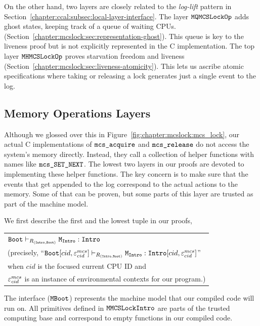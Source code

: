 On the other hand, two layers are closely related to the  \textit{log-lift} pattern in Section~\ref{chapter:ccal:subsec:local-layer-interface}.
The layer ${\mathrm{\texttt{MQMCSLockOp}}}$ adds ghost states, keeping track of a
queue of waiting CPUs.
(Section~\ref{chapter:mcslock:sec:representation-ghost}). This queue is key to the liveness proof but is not explicitly represented in the C implementation.
The top layer ${\mathrm{\texttt{MHMCSLockOp}}}$ proves starvation freedom and liveness
(Section~\ref{chapter:mcslock:sec:liveness-atomicity}). This lets us ascribe atomic
specifications where taking or releasing a lock generates just a
single event to the log.

\subsection{Memory Operations Layers}
\label{chapter:mcslock:subsec:lowestmachinemodel}


Although we glossed over this in Figure~\ref{fig:chapter:mcslock:mcs_lock}, our
actual C implementations of ${\mathrm{\texttt{mcs\_acquire}}}$ and
${\mathrm{\texttt{mcs\_release}}}$ do not access the system's memory directly.  Instead, they call
a collection of helper functions with names like
${\mathrm{\texttt{mcs\_SET\_NEXT}}}$. The lowest two layers in our proofs
are devoted to implementing these helper functions.
The key concern is to make sure that the events that get appended to the log correspond to the actual actions to the memory. Some of that can be proven, 
but some parts of this layer are trusted as part of the machine model.

We first describe the first and the lowest tuple in our proofs,

\begin{center}
\begin{tabular}{P{0.95\textwidth}}
${\mathrm{\texttt{Boot}}} \vdash_{R_{({\mathrm{\texttt{Intro}}}, {\mathrm{\texttt{Boot}}})}} {\mathrm{\texttt{M}}}_{{\mathrm{\texttt{Intro}}}} : {\mathrm{\texttt{Intro}}}$\\
(precisely, ``${\mathrm{\texttt{Boot}}}[cid, {\varepsilon}^{mcs}_{cid}] \vdash_{R_{({\mathrm{\texttt{Intro}}}, {\mathrm{\texttt{Boot}}})}} {\mathrm{\texttt{M}}}_{{\mathrm{\texttt{Intro}}}} : {\mathrm{\texttt{Intro}}}[cid, {\varepsilon}^{mcs}_{cid}]$'' \\
when $cid$ is the focused current CPU ID and\\
 ${\varepsilon}^{mcs}_{cid}$ is an instance of environmental contexts for our program.)\\
\end{tabular}
\end{center}

The interface (${\mathrm{\texttt{MBoot}}}$) represents the machine model that our compiled code will run on.
All primitives defined in ${\mathrm{\texttt{MMCSLockIntro}}}$ are parts of the trusted computing base and correspond to empty functions in our compiled code.

